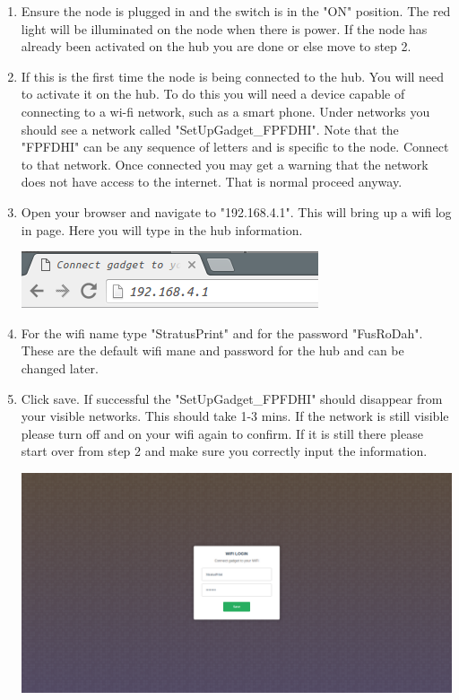 \documentclass [10pt]{book}
\begin{document}
    \begin{enumerate}
      \item Ensure the node is plugged in and the switch is in the "ON" position.
      The red light will be illuminated on the node when there is power. If the node
      has already been activated on the hub you are done or else move to step 2.

      \item If this is the first time the node is being connected to the hub.
      You will need to activate it on the hub. To do this you will need a device
      capable of connecting to a wi-fi network, such as a smart phone. Under networks
      you should see a network called "SetUpGadget\_FPFDHI". Note that the "FPFDHI"
      can be any sequence of letters and is specific to the node. Connect to that network.
      Once connected you may get a warning that the network does not have access
      to the internet. That is normal proceed anyway.

      \item Open your browser and navigate to "192.168.4.1". This will bring up
      a wifi log in page. Here you will type in the hub information.
      \begin{center}
      \includegraphics[scale=1]{ip-enter.png}
    \end{center}

      \item For the wifi name type "StratusPrint" and for the password "FusRoDah".
      These are the default wifi mane and password for the hub and can be changed later.

      \item Click save. If successful the "SetUpGadget\_FPFDHI" should disappear
      from your visible networks. This should take 1-3 mins. If the network is still
      visible please turn off and on your wifi again to confirm. If it is still there
      please start over from step 2 and make sure you correctly input the information.
      \begin{center}
      \includegraphics[scale=0.25]{wifi-login.png}
    \end{center}
    \end{enumerate}
\end{document}
